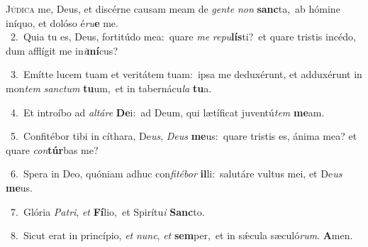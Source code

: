 \lettrine{\initial\textcolor{\initialcolor}{J}}{údica} me, Deus, et discérne causam meam de \textit{gen}\-\textit{te} \textit{non} \textbf{sanc}\-ta,~\star ab hómine iníquo, et dolóso é\-\textit{ru}\-\textbf{e} me.\\
{\numbfont\textcolor{\numbcolor}{~2.}}~Quia tu es, Deus, fortitúdo mea:~\dagger quare \textit{me} \textit{re}\-\textit{pu}\textbf{lís}ti?~\star et quare tristis incédo, dum afflígit me in\-\textit{i}\-\textbf{mí}cus?\par
{\numbfont\textcolor{\numbcolor}{~3.}}~Emítte lucem tuam et veritátem tuam:~\dagger ipsa me deduxérunt, et adduxérunt in mon\textit{tem} \textit{sanc}\-\textit{tum} \textbf{tu}\-um,~\star et in tabernácu\textit{la} \textbf{tu}\-a.\par
{\numbfont\textcolor{\numbcolor}{~4.}}~Et introíbo ad \textit{al}\-\textit{tá}\textit{re} \textbf{De}\-i:~\star ad Deum, qui lætíficat juventú\textit{tem} \textbf{me}\-am.\par
{\numbfont\textcolor{\numbcolor}{~5.}}~Confitébor tibi in cíthara, De\-\textit{us}\-, \textit{De}\-\textit{us} \textbf{me}\-us:~\star quare tristis es, ánima mea? et quare \textit{con}\-\textbf{túr}bas me?\par
{\numbfont\textcolor{\numbcolor}{~6.}}~Spera in Deo, quóniam adhuc con\-\textit{fi}\-\textit{té}\textit{bor} \textbf{il}\-li:~\star salutáre vultus mei, et De\textit{us} \textbf{me}\-us.\par
{\numbfont\textcolor{\numbcolor}{~7.}}~Glória \textit{Pa}\-\textit{tri}, \textit{et} \textbf{Fí}\-lio,~\star et Spirítu\textit{i} \textbf{Sanc}\-to.\par
{\numbfont\textcolor{\numbcolor}{~8.}}~Sicut erat in princípio, \textit{et} \textit{nunc}\-, \textit{et} \textbf{sem}\-per,~\star et in sǽcula sæculó\-\textit{rum}\-. \textbf{A}\-men.\par
